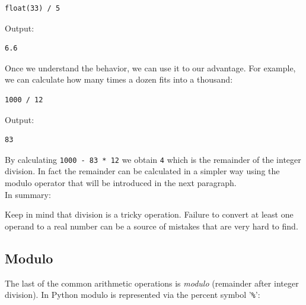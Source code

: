 \documentclass[article,A4,12pt]{llncs}
\begin{document}
\begin{bbox}
\begin{verbatim}
float(33) / 5
\end{verbatim}
\end{bbox}
\vspace{6mm}

\noindent
Output:\\

\begin{ybox}
\begin{verbatim}
6.6
\end{verbatim}
\end{ybox}
\vspace{6mm}

\noindent
Once we understand the behavior, we can use it to our advantage. For example,
we can calculate how many times a dozen fits into a thousand:\\

\begin{bbox}
\begin{verbatim}
1000 / 12
\end{verbatim}
\end{bbox}
\vspace{6mm}

\noindent
Output:\\

\begin{ybox}
\begin{verbatim}
83
\end{verbatim}
\end{ybox}
\vspace{6mm}

\noindent
By calculating {\tt 1000 - 83 * 12} we obtain {\tt 4} which is the remainder of the 
integer division. In fact the remainder can be calculated in a simpler way
using the modulo operator that will be introduced in the next paragraph.\\

\noindent
In summary:\\

\begin{gbox}
\begin{center}
Keep in mind that division is a tricky operation. Failure to convert at least one operand 
to a real number can be a source of mistakes that are very hard to find.
\end{center}
\end{gbox}

\subsection{Modulo}
The last of the common arithmetic operations is {\em modulo} (remainder 
after integer division). In Python modulo is represented via the percent symbol '{\tt \%}':\\
\end{document}
